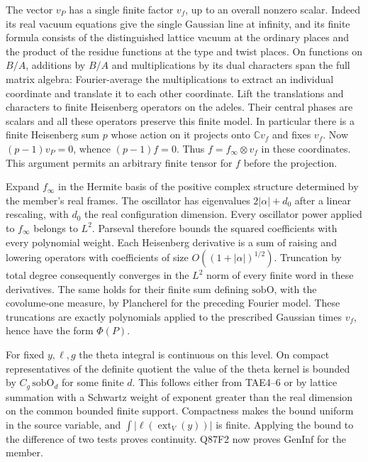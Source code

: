 The vector $v_P$ has a single finite factor $v_f$, up to an overall
nonzero scalar. Indeed its real vacuum equations give the single
Gaussian line at infinity, and its finite formula consists of the
distinguished lattice vacuum at the ordinary places and the product
of the residue functions at the type and twist places. On functions
on $B/A$, additions by $B/A$ and multiplications by its dual
characters span the full matrix algebra: Fourier-average the
multiplications to extract an individual coordinate and translate it
to each other coordinate. Lift the translations and characters to
finite Heisenberg operators on the adeles. Their central phases are
scalars and all these operators preserve this finite model.
In particular there is a finite Heisenberg sum $p$ whose action
on it projects onto $\mathbb C v_f$ and fixes $v_f$.
Now $(p-1)v_P=0$, whence $(p-1)f=0$. Thus $f=f_\infty\otimes v_f$
in these coordinates. This argument permits an arbitrary finite
tensor for $f$ before the projection.

Expand $f_\infty$ in the Hermite basis of the positive complex
structure determined by the member's real frames. The oscillator
has eigenvalues $2|\alpha|+d_0$ after a linear rescaling, with $d_0$
the real configuration dimension. Every oscillator power applied
to $f_\infty$ belongs to $L^2$. Parseval therefore bounds the
squared coefficients with every polynomial weight. Each Heisenberg
derivative is a sum of raising and lowering operators with
coefficients of size $O((1+|\alpha|)^{1/2})$.
Truncation by total degree consequently converges in the $L^2$ norm
of every finite word in these derivatives. The same holds for
their finite sum defining $\mathrm{sobO}$, with the covolume-one
measure, by Plancherel for the preceding Fourier model. These
truncations are exactly polynomials applied to the prescribed
Gaussian times $v_f$, hence have the form $\Phi(P)$.

For fixed $y,\ell,g$ the theta integral is continuous on this
level. On compact representatives of the definite quotient the
value of the theta kernel is bounded by $C_g\,\mathrm{sobO}_d$
for some finite $d$. This follows either from TAE4--6 or by lattice
summation with a Schwartz weight of exponent greater than the real
dimension on the common bounded finite support. Compactness makes
the bound uniform in the source variable, and
$\int |\ell(\operatorname{ext}_V(y))|$ is finite. Applying the
bound to the difference of two tests proves continuity. Q87F2 now
proves $\mathrm{GenInf}$ for the member.

